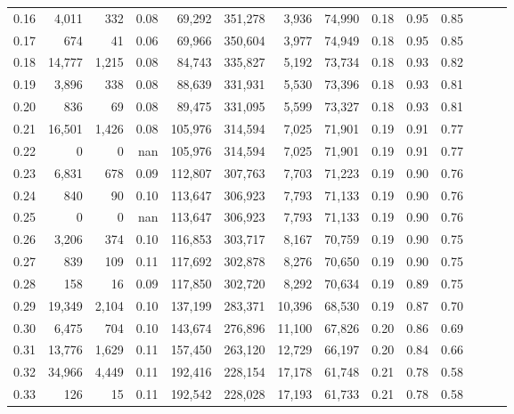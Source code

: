 \begin{tabular}{rrrrrrrrrrrrrr}
0.16 &   4,011 &    332 &  0.08 &   69,292 &  351,278 &   3,936 &  74,990 &  0.18 &  0.95 &      0.85 \\
0.17 &     674 &     41 &  0.06 &   69,966 &  350,604 &   3,977 &  74,949 &  0.18 &  0.95 &      0.85 \\
0.18 &  14,777 &  1,215 &  0.08 &   84,743 &  335,827 &   5,192 &  73,734 &  0.18 &  0.93 &      0.82 \\
0.19 &   3,896 &    338 &  0.08 &   88,639 &  331,931 &   5,530 &  73,396 &  0.18 &  0.93 &      0.81 \\
0.20 &     836 &     69 &  0.08 &   89,475 &  331,095 &   5,599 &  73,327 &  0.18 &  0.93 &      0.81 \\
0.21 &  16,501 &  1,426 &  0.08 &  105,976 &  314,594 &   7,025 &  71,901 &  0.19 &  0.91 &      0.77 \\
0.22 &       0 &      0 &   nan &  105,976 &  314,594 &   7,025 &  71,901 &  0.19 &  0.91 &      0.77 \\
0.23 &   6,831 &    678 &  0.09 &  112,807 &  307,763 &   7,703 &  71,223 &  0.19 &  0.90 &      0.76 \\
0.24 &     840 &     90 &  0.10 &  113,647 &  306,923 &   7,793 &  71,133 &  0.19 &  0.90 &      0.76 \\
0.25 &       0 &      0 &   nan &  113,647 &  306,923 &   7,793 &  71,133 &  0.19 &  0.90 &      0.76 \\
0.26 &   3,206 &    374 &  0.10 &  116,853 &  303,717 &   8,167 &  70,759 &  0.19 &  0.90 &      0.75 \\
0.27 &     839 &    109 &  0.11 &  117,692 &  302,878 &   8,276 &  70,650 &  0.19 &  0.90 &      0.75 \\
0.28 &     158 &     16 &  0.09 &  117,850 &  302,720 &   8,292 &  70,634 &  0.19 &  0.89 &      0.75 \\
0.29 &  19,349 &  2,104 &  0.10 &  137,199 &  283,371 &  10,396 &  68,530 &  0.19 &  0.87 &      0.70 \\
0.30 &   6,475 &    704 &  0.10 &  143,674 &  276,896 &  11,100 &  67,826 &  0.20 &  0.86 &      0.69 \\
0.31 &  13,776 &  1,629 &  0.11 &  157,450 &  263,120 &  12,729 &  66,197 &  0.20 &  0.84 &      0.66 \\
0.32 &  34,966 &  4,449 &  0.11 &  192,416 &  228,154 &  17,178 &  61,748 &  0.21 &  0.78 &      0.58 \\
0.33 &     126 &     15 &  0.11 &  192,542 &  228,028 &  17,193 &  61,733 &  0.21 &  0.78 &      0.58 \\

\end{tabular}
